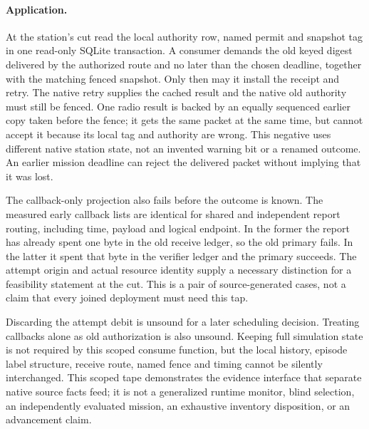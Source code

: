 \documentclass{article}
\begin{document}
\paragraph{Application.}
At the station's cut read the local authority row, named permit and
snapshot tag in one read-only SQLite transaction. A consumer demands
the old keyed digest delivered by the authorized route and no later
than the chosen deadline, together with the matching fenced snapshot.
Only then may it install the receipt and retry. The native retry
supplies the cached result and the native old authority must still
be fenced. One radio result is backed by an equally sequenced earlier
copy taken before the fence; it gets the same packet at the same
time, but cannot accept it because its local tag and authority are
wrong. This negative uses different native station state, not an
invented warning bit or a renamed outcome. An earlier mission
deadline can reject the delivered packet without implying that
it was lost.

The callback-only projection also fails before the outcome is known.
The measured early callback lists are identical for shared and
independent report routing, including time, payload and logical
endpoint. In the former the report has already spent one byte in
the old receive ledger, so the old primary fails. In the latter
it spent that byte in the verifier ledger and the primary succeeds.
The attempt origin and actual resource identity supply a necessary
distinction for a feasibility statement at the cut. This is a
pair of source-generated cases, not a claim that every joined
deployment must need this tap.

Discarding the attempt debit is unsound for a later scheduling
decision. Treating callbacks alone as old authorization is also
unsound. Keeping full simulation state is not required by this
scoped consume function, but the local history, episode label
structure, receive route, named fence and timing cannot be silently
interchanged. This scoped tape demonstrates the evidence interface
that separate native source facts feed; it is not a generalized
runtime monitor, blind selection, an independently evaluated mission,
an exhaustive inventory disposition, or an advancement claim.
\end{document}
